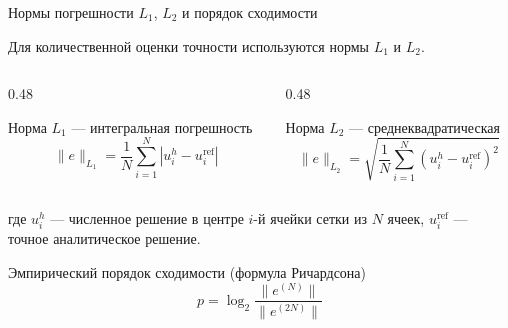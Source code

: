 \documentclass[ignoreonframetext,unicode,aspectratio=169]{beamer}
\begin{document}
\begin{frame}{Нормы погрешности $L_1$, $L_2$ и порядок сходимости}
	
	Для количественной оценки точности используются нормы $L_1$ и $L_2$.
	
	\vspace{0.2cm}
	\begin{columns}[t]
		\begin{column}{0.48\textwidth}
			\begin{block}{Норма $L_1$ --- интегральная погрешность}
				\[
				\|e\|_{L_1} = \frac{1}{N} \sum_{i=1}^{N}
				\left| u_i^h - u_i^{\mathrm{ref}} \right|
				\]
			\end{block}
		\end{column}
		\begin{column}{0.48\textwidth}
			\begin{block}{Норма $L_2$ --- среднеквадратическая}
				\[
				\|e\|_{L_2} = \sqrt{\frac{1}{N} \sum_{i=1}^{N}
					\left( u_i^h - u_i^{\mathrm{ref}} \right)^2}
				\]
			\end{block}
		\end{column}
	\end{columns}
	
	{\small где $u_i^h$ --- численное решение в центре $i$-й ячейки сетки
		из $N$ ячеек, $u_i^{\mathrm{ref}}$ --- точное аналитическое решение.}
	
	\vspace{0.2cm}
	\begin{block}{Эмпирический порядок сходимости (формула Ричардсона)}
		\[
		p = \log_2 \frac{\|e^{(N)}\|}{\|e^{(2N)}\|}
		\]
	\end{block}
	
\end{frame}
\end{document}
